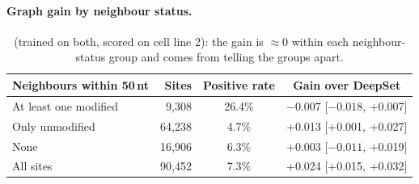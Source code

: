 \documentclass[11pt,a4paper]{article}
\newcommand{\mdl}[1]{\texttt{\detokenize{#1}}}
\begin{document}
\paragraph{Graph gain by neighbour status.}
\begin{table}[H]
    \centering\small
    \begin{tabular}{lrcc}
        \toprule
        \textbf{Neighbours within 50\,nt} & \textbf{Sites} & \textbf{Positive rate} & \textbf{Gain over DeepSet} \\
        \midrule
        At least one modified & 9,308 & 26.4\% & $-0.007$ [$-0.018$, +0.007] \\
        Only unmodified & 64,238 & 4.7\% & +0.013 [+0.001, +0.027] \\
        None & 16,906 & 6.3\% & +0.003 [$-0.011$, +0.019] \\
        All sites & 90,452 & 7.3\% & +0.024 [+0.015, +0.032] \\
        \bottomrule
    \end{tabular}
    \caption{\mdl{h2gcn_aux} (trained on both, scored on cell line 2): the gain
    is $\approx$0 within each neighbour-status group and comes from telling
    the groups apart.}
    \label{tab:status}
\end{table}
\end{document}

